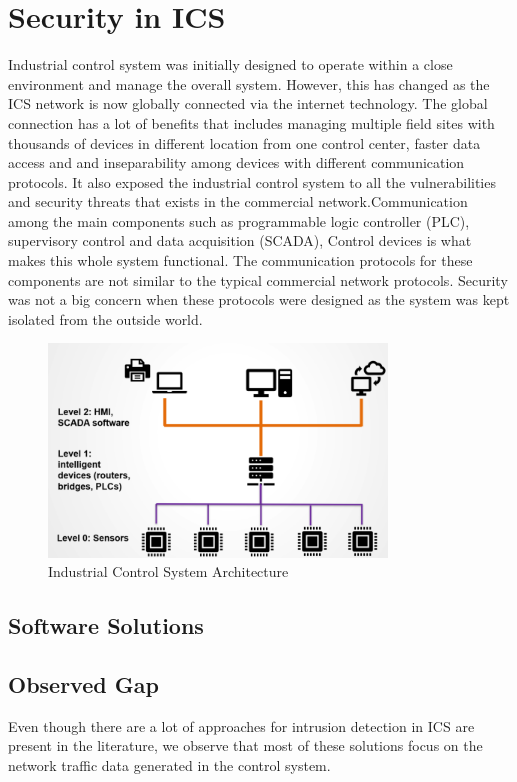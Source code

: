 \documentclass[conference]{IEEEtran}
\begin{document}
\section{Security in ICS}
Industrial control system was initially designed to operate within a close environment and manage the overall system. However, this has changed as the ICS network is now globally connected via the internet technology. The global connection has a lot of benefits that includes managing multiple field sites with thousands of devices in different location from one control center, faster data access and and inseparability among devices with different communication protocols. It also exposed the industrial control system to all the vulnerabilities and security threats that exists in the commercial network.Communication among the main components such as programmable logic controller (PLC), supervisory control and data acquisition (SCADA), Control devices is what makes this whole system functional. The communication protocols for these components are not similar to the typical commercial network protocols. Security was not a big concern when these protocols were designed as the system was kept isolated from the outside world. 
\begin{figure}[htbp]
\centering
\centerline{\includegraphics [width=9cm] {Architecture1.png}}
\caption{Industrial Control System Architecture}
\label{fig}
\end{figure}


\subsection{Software Solutions}\label{AA}
\subsection{Observed Gap}
Even though there are a lot of approaches for intrusion detection in ICS are present in the literature, we observe that most of these solutions focus on the network traffic data generated in the control system.  
\end{document}
